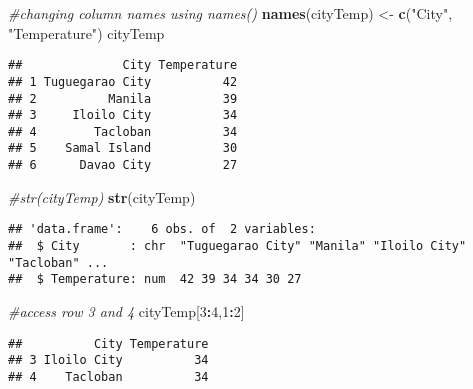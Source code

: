 \documentclass[
]{article}
\newenvironment{Shaded}{\begin{snugshade}}{\end{snugshade}}
\newcommand{\CommentTok}[1]{\textcolor[rgb]{0.56,0.35,0.01}{\textit{#1}}}
\newcommand{\DecValTok}[1]{\textcolor[rgb]{0.00,0.00,0.81}{#1}}
\newcommand{\FunctionTok}[1]{\textcolor[rgb]{0.13,0.29,0.53}{\textbf{#1}}}
\newcommand{\NormalTok}[1]{#1}
\newcommand{\OtherTok}[1]{\textcolor[rgb]{0.56,0.35,0.01}{#1}}
\newcommand{\SpecialCharTok}[1]{\textcolor[rgb]{0.81,0.36,0.00}{\textbf{#1}}}
\newcommand{\StringTok}[1]{\textcolor[rgb]{0.31,0.60,0.02}{#1}}
\begin{document}
\begin{Shaded}
\begin{Highlighting}[]
\CommentTok{\#changing column names using names() }
\FunctionTok{names}\NormalTok{(cityTemp) }\OtherTok{\textless{}{-}} \FunctionTok{c}\NormalTok{(}\StringTok{"City"}\NormalTok{, }\StringTok{"Temperature"}\NormalTok{)}
\NormalTok{cityTemp}
\end{Highlighting}
\end{Shaded}

\begin{verbatim}
##              City Temperature
## 1 Tuguegarao City          42
## 2          Manila          39
## 3     Iloilo City          34
## 4        Tacloban          34
## 5    Samal Island          30
## 6      Davao City          27
\end{verbatim}

\begin{Shaded}
\begin{Highlighting}[]
\CommentTok{\#str(cityTemp)}
\FunctionTok{str}\NormalTok{(cityTemp)}
\end{Highlighting}
\end{Shaded}

\begin{verbatim}
## 'data.frame':    6 obs. of  2 variables:
##  $ City       : chr  "Tuguegarao City" "Manila" "Iloilo City" "Tacloban" ...
##  $ Temperature: num  42 39 34 34 30 27
\end{verbatim}

\begin{Shaded}
\begin{Highlighting}[]
\CommentTok{\#access row 3 and 4}
\NormalTok{cityTemp[}\DecValTok{3}\SpecialCharTok{:}\DecValTok{4}\NormalTok{,}\DecValTok{1}\SpecialCharTok{:}\DecValTok{2}\NormalTok{]}
\end{Highlighting}
\end{Shaded}

\begin{verbatim}
##          City Temperature
## 3 Iloilo City          34
## 4    Tacloban          34
\end{verbatim}

\begin{Shaded}
\end{Shaded}
\end{document}
